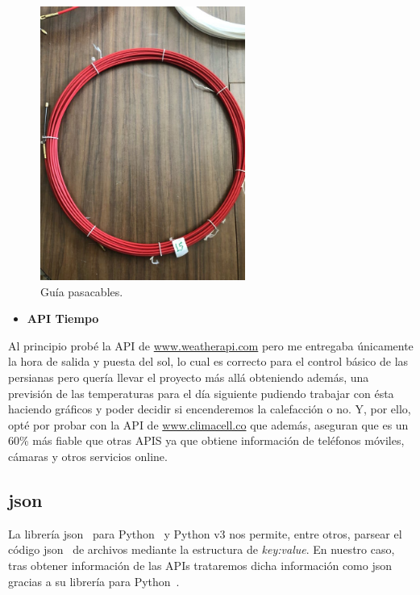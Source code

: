\begin{figure}
    \centering
    \includegraphics[width=0.6\textwidth, angle=90]{img/fotos/guiaPasacables.jpg}
    \caption{Guía pasacables.} \label{Img:guiaPasacables}
\end{figure}

\begin{itemize}
    \item \textbf{API Tiempo}\label{4:API_Tiempo}
\end{itemize}
Al principio probé la API de \url{www.weatherapi.com} pero me entregaba únicamente la hora de salida y puesta del sol, lo cual es correcto para el control básico de las persianas pero quería llevar el proyecto más allá obteniendo además, una previsión de las temperaturas para el día siguiente pudiendo trabajar con ésta haciendo gráficos y poder decidir si encenderemos la calefacción o no. Y, por ello, opté por probar con la API de \url{www.climacell.co} que además, aseguran que es un 60\% más fiable que otras APIS ya que obtiene información de teléfonos móviles, cámaras y otros servicios online.

\subsection{json}\label{4:JSON}
La librería json~\cite{misc:Json} para Python~\cite{misc:Python} y Python v3 nos permite, entre otros, parsear el código json~\cite{misc:Json} de archivos mediante la estructura de \textit{key:value}. En nuestro caso, tras obtener información de las APIs trataremos dicha información como json~\cite{misc:Json} gracias a su librería para Python~\cite{misc:Python}.

